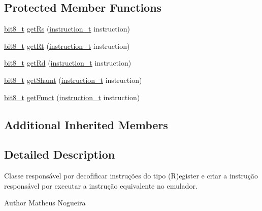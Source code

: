 \subsection*{Protected Member Functions}
\begin{DoxyCompactItemize}
\item 
\hyperlink{core_8hpp_a6074bae122ae7b527864eec42c728c3c}{bit8\+\_\+t} \hyperlink{classMIPS_1_1RegisterInstructionDecoder_a0bbf755b0116fe433976e461a4e1a5f5}{get\+Rs} (\hyperlink{core_8hpp_aa514fd240a0e29abb2a2e4c805d7f1a4}{instruction\+\_\+t} instruction)
\item 
\hyperlink{core_8hpp_a6074bae122ae7b527864eec42c728c3c}{bit8\+\_\+t} \hyperlink{classMIPS_1_1RegisterInstructionDecoder_ae19d48fb8633b1890b8fa338ff95e30b}{get\+Rt} (\hyperlink{core_8hpp_aa514fd240a0e29abb2a2e4c805d7f1a4}{instruction\+\_\+t} instruction)
\item 
\hyperlink{core_8hpp_a6074bae122ae7b527864eec42c728c3c}{bit8\+\_\+t} \hyperlink{classMIPS_1_1RegisterInstructionDecoder_a7c76f73b09b2c54fa5c91d8ab63243d4}{get\+Rd} (\hyperlink{core_8hpp_aa514fd240a0e29abb2a2e4c805d7f1a4}{instruction\+\_\+t} instruction)
\item 
\hyperlink{core_8hpp_a6074bae122ae7b527864eec42c728c3c}{bit8\+\_\+t} \hyperlink{classMIPS_1_1RegisterInstructionDecoder_adaf15a93eb18edbd179f115a5f155fa4}{get\+Shamt} (\hyperlink{core_8hpp_aa514fd240a0e29abb2a2e4c805d7f1a4}{instruction\+\_\+t} instruction)
\item 
\hyperlink{core_8hpp_a6074bae122ae7b527864eec42c728c3c}{bit8\+\_\+t} \hyperlink{classMIPS_1_1RegisterInstructionDecoder_a8c5e16f70817aece4eaf093707fbc165}{get\+Funct} (\hyperlink{core_8hpp_aa514fd240a0e29abb2a2e4c805d7f1a4}{instruction\+\_\+t} instruction)
\end{DoxyCompactItemize}
\subsection*{Additional Inherited Members}


\subsection{Detailed Description}
Classe responsável por decofificar instruções do tipo (R)egister e criar a instrução responsável por executar a instrução equivalente no emulador.

\begin{DoxyAuthor}{Author}
Matheus Nogueira 
\end{DoxyAuthor}


